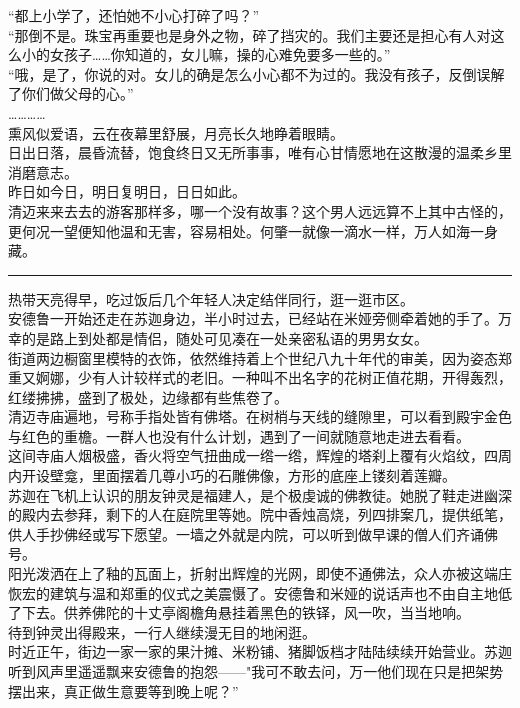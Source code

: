 \documentclass[oneside,11pt]{memoir} %
\begin{document}
\begin{CJK}{UTF8}{gbsn}
    “都上小学了，还怕她不小心打碎了吗？”\\\indent
    “那倒不是。珠宝再重要也是身外之物，碎了挡灾的。我们主要还是担心有人对这么小的女孩子……你知道的，女儿嘛，操的心难免要多一些的。”\\\indent
    “哦，是了，你说的对。女儿的确是怎么小心都不为过的。我没有孩子，反倒误解了你们做父母的心。”\\\indent
    …………\\\indent
    熏风似爱语，云在夜幕里舒展，月亮长久地睁着眼睛。\\\indent
    日出日落，晨昏流替，饱食终日又无所事事，唯有心甘情愿地在这散漫的温柔乡里消磨意志。\\\indent
    昨日如今日，明日复明日，日日如此。\\\indent
    清迈来来去去的游客那样多，哪一个没有故事？这个男人远远算不上其中古怪的，更何况一望便知他温和无害，容易相处。何肇一就像一滴水一样，万人如海一身藏。\\\indent
 \rule{-3pt}{30pt} 
    热带天亮得早，吃过饭后几个年轻人决定结伴同行，逛一逛市区。\\\indent
    安德鲁一开始还走在苏迦身边，半小时过去，已经站在米娅旁侧牵着她的手了。万幸的是路上到处都是情侣，随处可见凑在一处亲密私语的男男女女。\\\indent
    街道两边橱窗里模特的衣饰，依然维持着上个世纪八九十年代的审美，因为姿态郑重又婀娜，少有人计较样式的老旧。一种叫不出名字的花树正值花期，开得轰烈，红缕拂拂，盛到了极处，边缘都有些焦卷了。\\\indent
    清迈寺庙遍地，号称手指处皆有佛塔。在树梢与天线的缝隙里，可以看到殿宇金色与红色的重檐。一群人也没有什么计划，遇到了一间就随意地走进去看看。\\\indent
    这间寺庙人烟极盛，香火将空气扭曲成一绺一绺，辉煌的塔刹上覆有火焰纹，四周内开设壁龛，里面摆着几尊小巧的石雕佛像，方形的底座上镂刻着莲瓣。\\\indent
    苏迦在飞机上认识的朋友钟灵是福建人，是个极虔诚的佛教徒。她脱了鞋走进幽深的殿内去参拜，剩下的人在庭院里等她。院中香烛高烧，列四排案几，提供纸笔，供人手抄佛经或写下愿望。一墙之外就是内院，可以听到做早课的僧人们齐诵佛号。\\\indent
    阳光泼洒在上了釉的瓦面上，折射出辉煌的光网，即使不通佛法，众人亦被这端庄恢宏的建筑与温和郑重的仪式之美震慑了。安德鲁和米娅的说话声也不由自主地低了下去。供养佛陀的十丈亭阁檐角悬挂着黑色的铁铎，风一吹，当当地响。\\\indent
    待到钟灵出得殿来，一行人继续漫无目的地闲逛。\\\indent
    时近正午，街边一家一家的果汁摊、米粉铺、猪脚饭档才陆陆续续开始营业。苏迦听到风声里遥遥飘来安德鲁的抱怨——"我可不敢去问，万一他们现在只是把架势摆出来，真正做生意要等到晚上呢？”\\\indent

\end{CJK}
\end{document}
